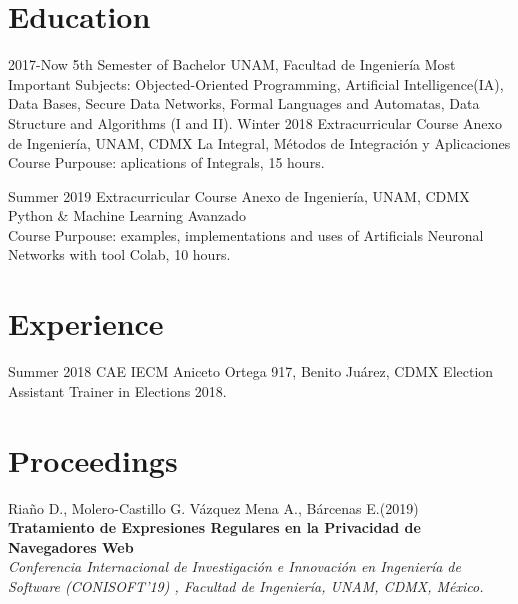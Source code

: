 \documentclass[]{friggeri-cv}
\begin{document}
\section{Education}
\begin{entrylist}
\entry
    {2017-Now}
    {5th Semester of Bachelor}
    {UNAM, Facultad de Ingeniería}
    {Most Important Subjects: Objected-Oriented Programming, Artificial Intelligence(IA), Data Bases, Secure Data Networks,     
    Formal Languages and Automatas, Data Structure and Algorithms (I and II).
    }
\entry
    {Winter 2018}
    {Extracurricular Course}
    {Anexo de Ingeniería, UNAM, CDMX}
    {La Integral, Métodos de Integración y Aplicaciones\\
    Course Purpouse: aplications of Integrals, 15 hours.}

\entry
    {Summer 2019}
    {Extracurricular Course}
    {Anexo de Ingeniería, UNAM, CDMX}
    {Python \& Machine Learning Avanzado\\
    Course Purpouse: examples, implementations and uses of Artificials Neuronal Networks with tool Colab, 10 hours.}

\end{entrylist}

\section{Experience}
\begin{entrylist}
  \entry
    {Summer 2018}
    {CAE IECM}
    {Aniceto Ortega 917, Benito Juárez, CDMX}
    {Election Assistant Trainer in Elections 2018.\\}
  
\end{entrylist}



\section{Proceedings}
Riaño D., Molero-Castillo G. Vázquez Mena A., Bárcenas E.(2019)\\
\textbf{Tratamiento de Expresiones Regulares en la Privacidad de Navegadores Web}\\
\emph{Conferencia Internacional de Investigación e Innovación en Ingeniería de Software (CONISOFT’19) , Facultad de Ingeniería, UNAM, CDMX, México.}
\end{document}
